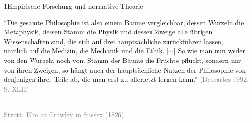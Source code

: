 \documentclass[xcolor=table,9pt,aspectratio=169]{beamer}
\begin{document}
\begin{frame}{\vspace*{10mm}1\hspace*{1em}Empirische Forschung und normative Theorie}
\begin{multicols}{2}
\enquote{Die gesamte Philosophie ist also einem Baume vergleichbar, dessen Wurzeln die Metaphysik, dessen Stamm die Physik und dessen Zweige alle übrigen Wissenschaften sind, die sich auf drei hauptsächliche zurückführen lassen, nämlich auf die Medizin, die Mechanik und die Ethik. [$\cdots$] So wie man nun weder von den Wurzeln noch vom Stamm der Bäume die Früchte pflückt, sondern nur von ihren Zweigen, so hängt auch der hauptsächliche Nutzen der Philosophie von denjenigen ihrer Teile ab, die man erst zu allerletzt lernen kann.} \textcolor{gray}{(Descartes 1992, S. XLII)}
   \vfill
   \begin{center}
      \\
      \textcolor{gray}{Strutt: Elm at Crawley in Sussex (1826)}
   \end{center}
\end{multicols}
\end{frame}
\end{document}
